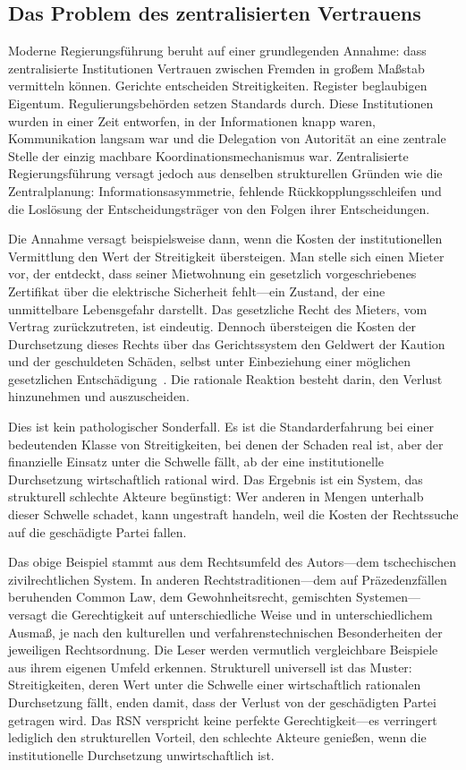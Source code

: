 \documentclass[11pt,a4paper,twocolumn]{article}
\begin{document}
\subsection{Das Problem des zentralisierten Vertrauens}

Moderne Regierungsführung beruht auf einer grundlegenden Annahme: dass zentralisierte Institutionen Vertrauen zwischen Fremden in großem Maßstab vermitteln können. Gerichte entscheiden Streitigkeiten. Register beglaubigen Eigentum. Regulierungsbehörden setzen Standards durch. Diese Institutionen wurden in einer Zeit entworfen, in der Informationen knapp waren, Kommunikation langsam war und die Delegation von Autorität an eine zentrale Stelle der einzig machbare Koordinationsmechanismus war. Zentralisierte Regierungsführung versagt jedoch aus denselben strukturellen Gründen wie die Zentralplanung: Informationsasymmetrie, fehlende Rückkopplungsschleifen und die Loslösung der Entscheidungsträger von den Folgen ihrer Entscheidungen.

Die Annahme versagt beispielsweise dann, wenn die Kosten der institutionellen Vermittlung den Wert der Streitigkeit übersteigen. Man stelle sich einen Mieter vor, der entdeckt, dass seiner Mietwohnung ein gesetzlich vorgeschriebenes Zertifikat über die elektrische Sicherheit fehlt---ein Zustand, der eine unmittelbare Lebensgefahr darstellt. Das gesetzliche Recht des Mieters, vom Vertrag zurückzutreten, ist eindeutig. Dennoch übersteigen die Kosten der Durchsetzung dieses Rechts über das Gerichtssystem den Geldwert der Kaution und der geschuldeten Schäden, selbst unter Einbeziehung einer möglichen gesetzlichen Entschädigung~\cite{czcourtfees}. Die rationale Reaktion besteht darin, den Verlust hinzunehmen und auszuscheiden.

Dies ist kein pathologischer Sonderfall. Es ist die Standarderfahrung bei einer bedeutenden Klasse von Streitigkeiten, bei denen der Schaden real ist, aber der finanzielle Einsatz unter die Schwelle fällt, ab der eine institutionelle Durchsetzung wirtschaftlich rational wird. Das Ergebnis ist ein System, das strukturell schlechte Akteure begünstigt: Wer anderen in Mengen unterhalb dieser Schwelle schadet, kann ungestraft handeln, weil die Kosten der Rechtssuche auf die geschädigte Partei fallen.

Das obige Beispiel stammt aus dem Rechtsumfeld des Autors---dem tschechischen zivilrechtlichen System. In anderen Rechtstraditionen---dem auf Präzedenzfällen beruhenden Common Law, dem Gewohnheitsrecht, gemischten Systemen---versagt die Gerechtigkeit auf unterschiedliche Weise und in unterschiedlichem Ausmaß, je nach den kulturellen und verfahrenstechnischen Besonderheiten der jeweiligen Rechtsordnung. Die Leser werden vermutlich vergleichbare Beispiele aus ihrem eigenen Umfeld erkennen. Strukturell universell ist das Muster: Streitigkeiten, deren Wert unter die Schwelle einer wirtschaftlich rationalen Durchsetzung fällt, enden damit, dass der Verlust von der geschädigten Partei getragen wird. Das RSN verspricht keine perfekte Gerechtigkeit---es verringert lediglich den strukturellen Vorteil, den schlechte Akteure genießen, wenn die institutionelle Durchsetzung unwirtschaftlich ist.
\end{document}
